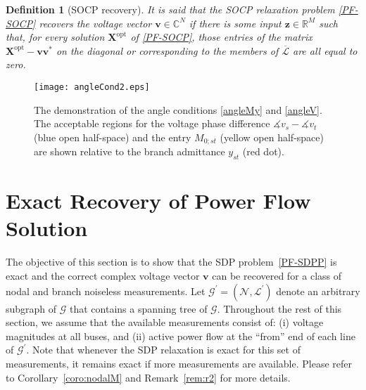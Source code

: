 \documentclass[journal,twoside]{IEEEtran}
\newtheorem{definition}{Definition}
\newcommand{\bv}{\mathbf{v}}
\newcommand{\bz}{\mathbf{z}}
\newcommand{\bX}{\mathbf{X}}
\newcommand{\cG}{{\mathcal G}}
\newcommand{\cL}{{\mathcal L}}
\newcommand{\cN}{{\mathcal N}}
\begin{document}
\begin{definition}[SOCP recovery]
	It is said that the SOCP relaxation problem \eqref{PF-SOCP} recovers the voltage vector $\bv \in \mathbb{C}^N$ if there is some  input $\bz \in \mathbb{R}^M$ such that, for every solution $\bX^{\mathrm{opt}}$ of  \eqref{PF-SOCP}, those entries of the matrix $\bX^{\mathrm{opt}}-\bv\bv^{*}$ on the diagonal or corresponding   to the members of $\overline\cL$ are all equal to zero.
\end{definition}

\begin{figure}[t]
	\centering
	{\texttt{[image: angleCond2.eps]}}
	\caption{The demonstration of the angle conditions \eqref{angleMy} and \eqref{angleV}. The acceptable
regions for the voltage phase difference $\measuredangle v_{s}-\measuredangle v_{t}$ (blue open half-space)
and the entry $M_{0;st}$ (yellow open half-space) are shown relative to the  branch admittance $y_{st}$ (red dot). }
	\label{fig:angleCond}
\end{figure}

\vspace{-2mm}

\section{Exact Recovery of Power Flow Solution}

The objective of this section is to show that the SDP problem~\eqref{PF-SDPP} is exact and the correct complex voltage  vector $\bv$ can be recovered for a class of nodal and branch noiseless measurements.
Let $\cG^{\prime} = (\cN,\cL^{\prime})$ denote an arbitrary  subgraph of $\mathcal G$ that contains a spanning tree of $\mathcal G$.
Throughout the rest of this section, we assume that the available measurements consist of:
(i) voltage magnitudes at all buses, and
(ii) active power flow at the ``from'' end of each line of $\cG^{\prime}$. Note that whenever the SDP relaxation is exact for this set of measurements, it remains exact if more measurements are available. Please refer to Corollary~\ref{coro:nodalM} and Remark~\ref{rem:r2} for more details. 
\end{document}
